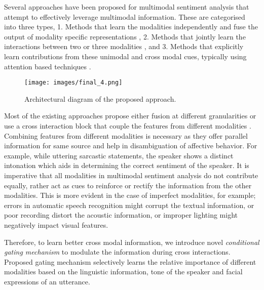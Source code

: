\documentclass{article}
\begin{document}
Several approaches have been proposed for multimodal sentiment analysis that attempt to effectively leverage multimodal information.
These are categorised into three types, 1. Methods that learn the modalities independently and fuse the output of modality specific representations \cite{DBLP:journals/expert/WollmerWKSSSM13, poria2017context}, 
2. Methods that jointly learn the interactions between two or three modalities \cite{DBLP:conf/emnlp/ZadehCPCM17, sun2019multi}, and 
3. Methods that explicitly learn contributions from these unimodal and cross modal cues, typically using attention based techniques \cite{DBLP:conf/icmi/ChenWLBZM17, zadeh2018multi, DBLP:conf/acl/MorencyCPLZ18, zadeh2018memory, georgiou2019deep, DBLP:conf/emnlp/GhosalACPEB18}.







\begin{figure*}[ht]
    \centering
\texttt{[image: images/final\_4.png]}
    \caption{Architectural diagram of the proposed approach.}
    \label{fig:architecture}
\end{figure*}
Most of the existing approaches propose either fusion at different granularities \cite{DBLP:conf/emnlp/ZadehCPCM17, georgiou2019deep} or use a cross interaction block that couple the features from different modalities \cite{DBLP:conf/emnlp/GhosalACPEB18, zadeh2018multi}. 
Combining features from different modalities is necessary as they offer parallel information for same source and help in disambiguation of affective behavior. For example, while uttering sarcastic statements, the speaker shows a distinct intonation which aids in determining the correct sentiment of the speaker.
It is imperative that all modalities in multimodal sentiment analysis do not contribute equally, rather act as cues to reinforce or rectify the information from the other modalities.
This is more evident in the case of imperfect modalities, for example; errors in automatic speech recognition might corrupt the textual information, or poor recording distort the acoustic information, or improper lighting might negatively impact visual features.

Therefore, to learn better cross modal information, we introduce novel \textit{conditional gating mechanism} to modulate the information during cross interactions. Proposed gating mechanism selectively learns the relative importance of different modalities based on the linguistic information, tone of the speaker and facial expressions of an utterance.
\end{document}
